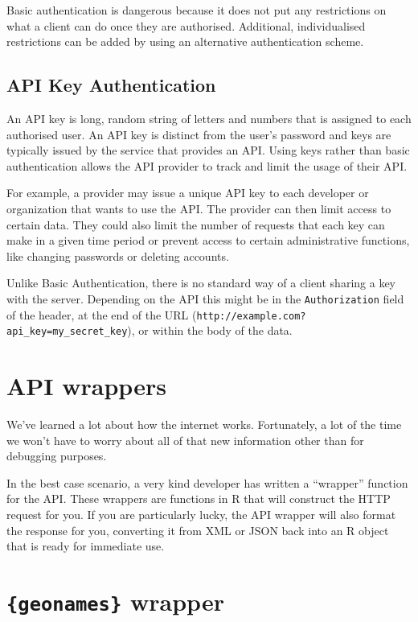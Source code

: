 \documentclass[
  letterpaper,
  DIV=11,
  numbers=noendperiod]{scrreprt}
\begin{document}
Basic authentication is dangerous because it does not put any
restrictions on what a client can do once they are authorised.
Additional, individualised restrictions can be added by using an
alternative authentication scheme.

\subsection{API Key Authentication}\label{api-key-authentication}

An API key is long, random string of letters and numbers that is
assigned to each authorised user. An API key is distinct from the user's
password and keys are typically issued by the service that provides an
API. Using keys rather than basic authentication allows the API provider
to track and limit the usage of their API.

For example, a provider may issue a unique API key to each developer or
organization that wants to use the API. The provider can then limit
access to certain data. They could also limit the number of requests
that each key can make in a given time period or prevent access to
certain administrative functions, like changing passwords or deleting
accounts.

Unlike Basic Authentication, there is no standard way of a client
sharing a key with the server. Depending on the API this might be in the
\texttt{Authorization} field of the header, at the end of the URL
(\texttt{http://example.com?api\_key=my\_secret\_key}), or within the
body of the data.

\section{API wrappers}\label{api-wrappers}

We've learned a lot about how the internet works. Fortunately, a lot of
the time we won't have to worry about all of that new information other
than for debugging purposes.

In the best case scenario, a very kind developer has written a
``wrapper'' function for the API. These wrappers are functions in R that
will construct the HTTP request for you. If you are particularly lucky,
the API wrapper will also format the response for you, converting it
from XML or JSON back into an R object that is ready for immediate use.

\section{\texorpdfstring{\texttt{\{geonames\}}
wrapper}{\{geonames\} wrapper}}\label{geonames-wrapper}
\end{document}
